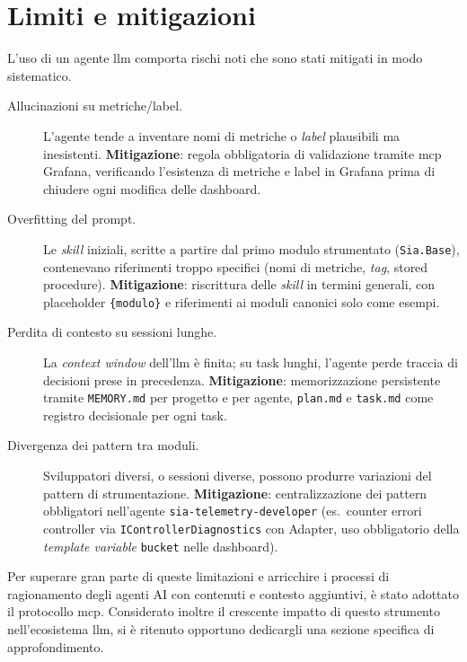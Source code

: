 \section{Limiti e mitigazioni}

L'uso di un agente \gls{llm} comporta rischi noti che sono stati mitigati in modo sistematico.

\begin{description}
      \item[Allucinazioni su metriche/label.] L'agente tende a inventare nomi di metriche o
            \emph{label} plausibili ma inesistenti. \textbf{Mitigazione}: regola obbligatoria di
            validazione tramite \gls{mcp} Grafana, verificando l'esistenza di metriche e label in Grafana
            prima di chiudere ogni modifica delle dashboard.
      \item[Overfitting del prompt.] Le \emph{skill} iniziali, scritte a partire dal primo
            modulo strumentato (\texttt{Sia.Base}), contenevano riferimenti troppo specifici
            (nomi di metriche, \emph{tag}, stored procedure). \textbf{Mitigazione}: riscrittura
            delle \emph{skill} in termini generali, con placeholder \texttt{\{modulo\}} e
            riferimenti ai moduli canonici solo come esempi.
      \item[Perdita di contesto su sessioni lunghe.] La \emph{context window} dell'\gls{llm} è
            finita; su task lunghi, l'agente perde traccia di decisioni prese in precedenza.
            \textbf{Mitigazione}: memorizzazione persistente tramite \texttt{MEMORY.md} per
            progetto e per agente, \texttt{plan.md} e \texttt{task.md} come registro decisionale
            per ogni task.
      \item[Divergenza dei pattern tra moduli.] Sviluppatori diversi, o sessioni diverse, possono
            produrre variazioni del pattern di strumentazione. \textbf{Mitigazione}:
            centralizzazione dei pattern obbligatori nell'agente \texttt{sia-telemetry-developer}
            (es.\ counter errori controller via \texttt{IControllerDiagnostics} con Adapter, uso
            obbligatorio della \emph{template variable} \texttt{bucket} nelle dashboard).
\end{description}
Per superare gran parte di queste limitazioni e arricchire i processi di ragionamento degli agenti AI
con contenuti e contesto aggiuntivi, è stato adottato il protocollo \gls{mcp}.
Considerato inoltre il crescente impatto di questo strumento nell’ecosistema \gls{llm},
si è ritenuto opportuno dedicargli una sezione specifica di approfondimento.


